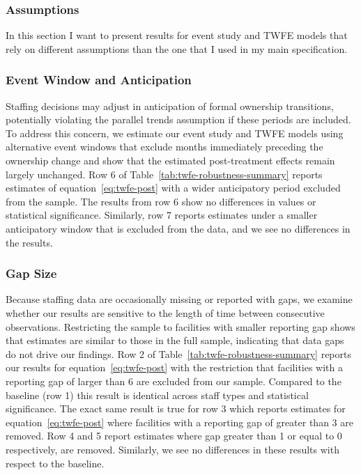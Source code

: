 \documentclass[preprint,authoryear]{elsarticle}
\begin{document}
\subsubsection{Assumptions}

In this section I want to present results for event study and TWFE models that rely on different assumptions than the one that I used in my main specification.


\subsubsection{Event Window and Anticipation}

Staffing decisions may adjust in anticipation of formal ownership transitions, potentially violating the parallel trends assumption if these periods are included. To address this concern, we estimate our event study and TWFE models using alternative event windows that exclude months immediately preceding the ownership change and show that the estimated post-treatment effects remain largely unchanged. Row 6 of Table~\ref{tab:twfe-robustness-summary} reports estimates of equation~\ref{eq:twfe-post} with a wider anticipatory period excluded from the sample. The results from row 6 show no differences in values or statistical significance. Similarly, row 7 reports estimates under a smaller anticipatory window that is excluded from the data, and we see no differences in the results.

\subsubsection{Gap Size}

Because staffing data are occasionally missing or reported with gaps, we examine whether our results are sensitive to the length of time between consecutive observations. Restricting the sample to facilities with smaller reporting gap shows that estimates are similar to those in the full sample, indicating that data gaps do not drive our findings. Row 2 of Table~\ref{tab:twfe-robustness-summary} reports our results for equation~\ref{eq:twfe-post} with the restriction that facilities with a reporting gap of larger than 6 are excluded from our sample. Compared to the baseline (row 1) this result is identical across staff types and statistical significance. The exact same result is true for row 3 which reports estimates for equation~\ref{eq:twfe-post} where facilities with a reporting gap of greater than 3 are removed. Row 4 and 5 report estimates where gap greater than 1 or equal to 0 respectively, are removed. Similarly, we see no differences in these results with respect to the baseline. 
\end{document}
